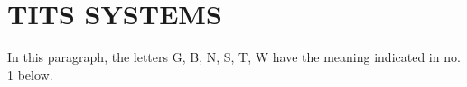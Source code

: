\section{TITS SYSTEMS}

In this paragraph, the letters G, B, N, S, T, W have the meaning indicated in no. 1 below.


